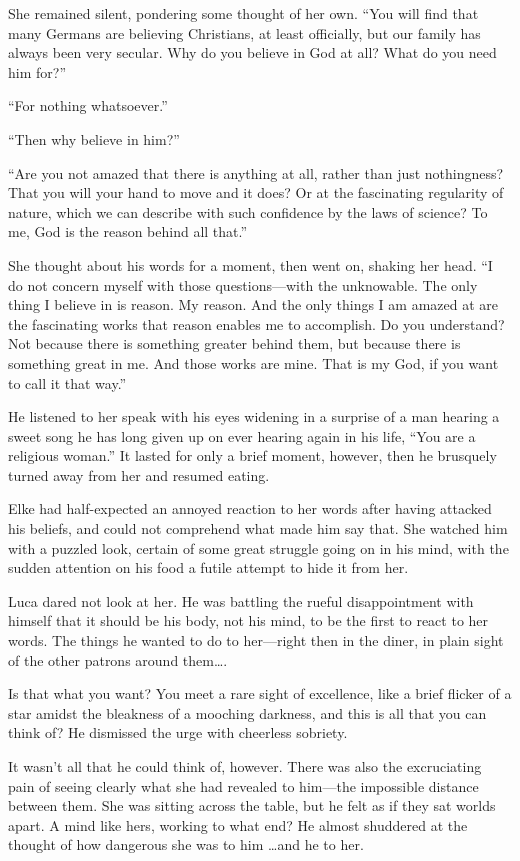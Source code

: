 She remained silent, pondering some thought of her own. ``You will find that many Germans are believing Christians, at least officially, but our family has always been very secular. Why do you believe in God at all? What do you need him for?''

``For nothing whatsoever.''

``Then why believe in him?''

``Are you not amazed that there is anything at all, rather than just nothingness? That you will your hand to move and it does? Or at the fascinating regularity of nature, which we can describe with such confidence by the laws of science? To me, God is the reason behind all that.''

She thought about his words for a moment, then went on, shaking her head. ``I do not concern myself with those questions---with the unknowable. The only thing I believe in is reason. My reason. And the only things I am amazed at are the fascinating works that reason enables me to accomplish. Do you understand? Not because there is something greater behind them, but because there is something great in me. And those works are mine. That is my God, if you want to call it that way.''

He listened to her speak with his eyes widening in a surprise of a man hearing a sweet song he has long given up on ever hearing again in his life, ``You are a religious woman.'' It lasted for only a brief moment, however, then he brusquely turned away from her and resumed eating.

Elke had half-expected an annoyed reaction to her words after having attacked his beliefs, and could not comprehend what made him say that. She watched him with a puzzled look, certain of some great struggle going on in his mind, with the sudden attention on his food a futile attempt to hide it from her.

Luca dared not look at her. He was battling the rueful disappointment with himself that it should be his body, not his mind, to be the first to react to her words. The things he wanted to do to her---right then in the diner, in plain sight of the other patrons around them\ldots.

Is that what you want? You meet a rare sight of excellence, like a brief flicker of a star amidst the bleakness of a mooching darkness, and this is all that you can think of? He dismissed the urge with cheerless sobriety.

It wasn't all that he could think of, however. There was also the excruciating pain of seeing clearly what she had revealed to him---the impossible distance between them. She was sitting across the table, but he felt as if they sat worlds apart. A mind like hers, working to what end? He almost shuddered at the thought of how dangerous she was to him \ldots and he to her.

